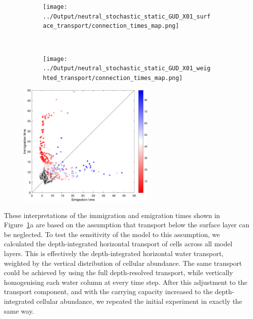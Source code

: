 \documentclass[12pt]{article}
\begin{document}
\begin{figure}[t!]
    \centering
    \begin{subfigure}[b]{0.5\textwidth}
        \centering
        \texttt{[image: ../Output/neutral\_stochastic\_static\_GUD\_X01\_surface\_transport/connection\_times\_map.png]}
    \end{subfigure}%
~
    \begin{subfigure}[b]{0.5\textwidth}
        \centering
        \texttt{[image: ../Output/neutral\_stochastic\_static\_GUD\_X01\_weighted\_transport/connection\_times\_map.png]}
    \end{subfigure}%
    \caption{}
\label{Connectivity_maps}
\end{figure}


\begin{figure}[t!]
    \centering
        \includegraphics[width=0.6\textwidth]{../Figures/imm_vs_em.png}
    \caption{}
\label{Imm_vs_em}
\end{figure}

These interpretations of the immigration and emigration times shown in Figure~\ref{Connectivity_maps}a are based on the assumption that transport below the surface layer can be neglected. To test the sensitivity of the model to this assumption, we calculated the depth-integrated horizontal transport of cells across all model layers. This is effectively the depth-integrated horizontal water transport, weighted by the vertical distribution of cellular abundance. The same transport could be achieved by using the full depth-resolved transport, while vertically homogenising each water column at every time step. After this adjustment to the transport component, and with the carrying capacity increased to the depth-integrated cellular abundance, we repeated the initial experiment in exactly the same way. 
\end{document}
